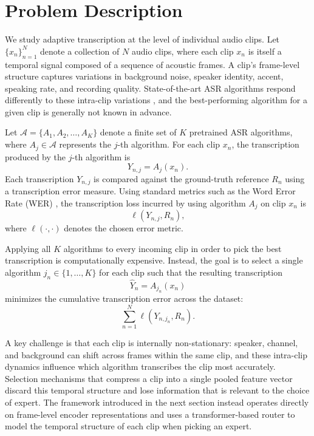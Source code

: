 \documentclass[journal]{IEEEtran}
\begin{document}
\section{Problem Description}
\label{sec:problem}

We study adaptive transcription at the level of individual audio clips. Let $\{x_n\}_{n=1}^{N}$ denote a collection of $N$ audio clips, where each clip $x_n$ is itself a temporal signal composed of a sequence of acoustic frames. A clip's frame-level structure captures variations in background noise, speaker identity, accent, speaking rate, and recording quality. State-of-the-art ASR algorithms respond differently to these intra-clip variations \cite{yu2016asrdeep,li2014overviewrobust}, and the best-performing algorithm for a given clip is generally not known in advance.

Let $\mathcal{A} = \{A_1, A_2, \ldots, A_K\}$ denote a finite set of $K$ pretrained ASR algorithms, where $A_j \in \mathcal{A}$ represents the $j$-th algorithm. For each clip $x_n$, the transcription produced by the $j$-th algorithm is
\[
Y_{n,j} = A_j(x_n).
\]
Each transcription $Y_{n,j}$ is compared against the ground-truth reference $R_n$ using a transcription error measure. Using standard metrics such as the Word Error Rate (WER) \cite{li2014overviewrobust}, the transcription loss incurred by using algorithm $A_j$ on clip $x_n$ is
\[
\ell(Y_{n,j}, R_n),
\]
where $\ell(\cdot,\cdot)$ denotes the chosen error metric.

Applying all $K$ algorithms to every incoming clip in order to pick the best transcription is computationally expensive. Instead, the goal is to select a single algorithm $j_n \in \{1,\dots,K\}$ for each clip such that the resulting transcription
\[
\hat{Y}_n = A_{j_n}(x_n)
\]
minimizes the cumulative transcription error across the dataset:
\begin{equation}
\sum_{n=1}^{N} \ell(Y_{n,j_n}, R_n).
\end{equation}

A key challenge is that each clip is internally non-stationary: speaker, channel, and background can shift across frames within the same clip, and these intra-clip dynamics influence which algorithm transcribes the clip most accurately. Selection mechanisms that compress a clip into a single pooled feature vector discard this temporal structure and lose information that is relevant to the choice of expert. The framework introduced in the next section instead operates directly on frame-level encoder representations and uses a transformer-based router to model the temporal structure of each clip when picking an expert.
\end{document}
